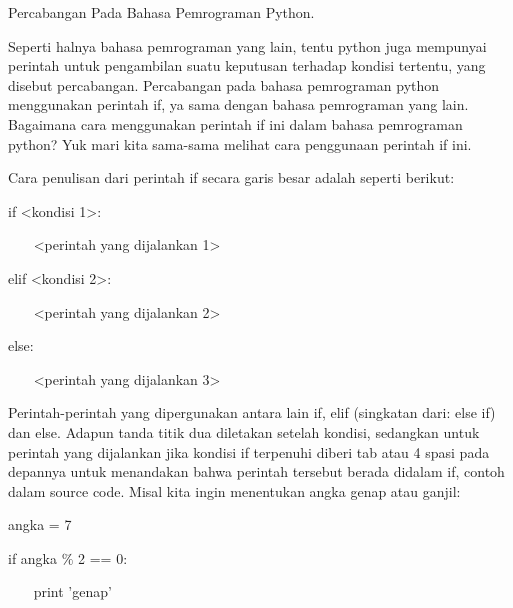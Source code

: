 \vspace{12pt}
\noindent 
Percabangan Pada Bahasa Pemrograman Python. \par
\vspace{12pt}
\noindent 
Seperti halnya bahasa pemrograman yang lain, tentu python juga mempunyai perintah untuk pengambilan suatu keputusan terhadap kondisi tertentu, yang disebut percabangan. Percabangan pada bahasa pemrograman python menggunakan perintah $  $if, ya sama dengan bahasa pemrograman yang lain. Bagaimana cara menggunakan perintah $  $if $  $ini dalam bahasa pemrograman python? Yuk mari kita sama-sama melihat cara penggunaan perintah $  $if $  $ini. \par
\vspace{12pt}
\noindent 
Cara penulisan dari perintah if secara garis besar adalah seperti berikut: \par
\noindent 
if <kondisi 1>: \par
\vspace{12pt}
\noindent 
~~~ <perintah yang dijalankan 1> \par
\vspace{12pt}
\noindent 
elif <kondisi 2>: \par
\vspace{12pt}
\noindent 
~~~ <perintah yang dijalankan 2> \par
\vspace{12pt}
\noindent 
else: \par
\vspace{12pt}
\noindent 
~~~ <perintah yang dijalankan 3> \par
\vspace{12pt}
\noindent 
Perintah-perintah yang dipergunakan antara lain $  $if, $  $elif $  $(singkatan dari: $  $else if) dan $  $else. Adapun tanda titik dua diletakan setelah kondisi, sedangkan untuk perintah yang dijalankan jika kondisi if terpenuhi diberi $  $tab $  $atau $  $4 spasi $  $pada depannya untuk menandakan bahwa perintah tersebut berada didalam if, contoh dalam source code. Misal kita ingin menentukan angka genap atau ganjil: \par
\vspace{12pt}
\noindent 
angka = 7 \par
\vspace{12pt}
\noindent 
if angka  $  \%  $ 2 == 0: \par
\vspace{12pt}
\noindent 
~~~ print 'genap' \par
\vspace{12pt}
